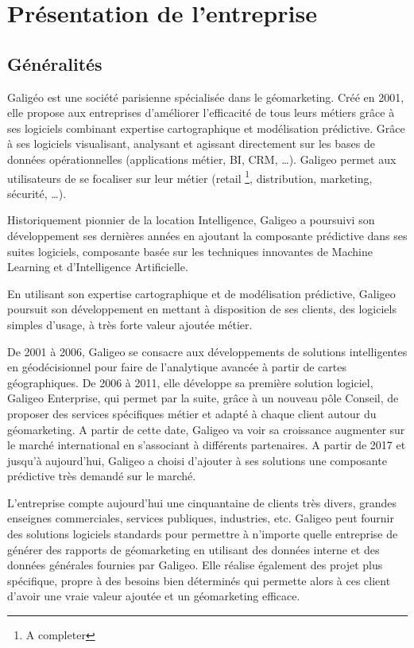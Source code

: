 
\section{Présentation de l'entreprise}

\subsection{Généralités}

Galigéo est une société parisienne spécialisée dans le géomarketing. Créé en 2001, elle propose aux entreprises d’améliorer l’efficacité de tous leurs métiers grâce à ses logiciels combinant expertise cartographique et modélisation prédictive. Grâce à ses logiciels visualisant, analysant et agissant directement sur les bases de données opérationnelles (applications métier, BI, CRM, …). Galigeo permet aux utilisateurs de se focaliser sur leur métier (retail \footnote{A completer}, distribution, marketing, sécurité, …).

Historiquement pionnier de la location Intelligence, Galigeo a poursuivi son développement ses dernières années en ajoutant la composante prédictive dans ses suites logiciels, composante basée sur les techniques innovantes de Machine Learning et d’Intelligence Artificielle.

En utilisant son expertise cartographique et de modélisation prédictive, Galigeo poursuit son développement en mettant à disposition de ses clients, des logiciels simples d’usage, à très forte valeur ajoutée métier.

De 2001 à 2006, Galigeo se consacre aux développements de solutions intelligentes en géodécisionnel pour faire de l'analytique avancée à partir de cartes géographiques. De 2006 à 2011, elle développe sa première solution logiciel, Galigeo Enterprise, qui permet par la suite, grâce à un nouveau pôle Conseil, de proposer des services spécifiques métier et adapté à chaque client autour du géomarketing. A partir de cette date, Galigeo va voir sa croissance augmenter sur le marché international en s'associant à différents partenaires. A partir de 2017 et jusqu'à aujourd'hui, Galigeo a choisi d'ajouter à ses solutions une composante prédictive très demandé sur le marché.

L'entreprise compte aujourd'hui une cinquantaine de clients très divers, grandes enseignes commerciales, services publiques, industries, etc. Galigeo peut fournir des solutions logiciels standards pour permettre à n’importe quelle entreprise de générer des rapports de géomarketing en utilisant des données interne et des données générales fournies par Galigeo. Elle réalise également des projet plus spécifique, propre à des besoins bien déterminés qui permette alors à ces client d’avoir une vraie valeur ajoutée et un géomarketing efficace.

